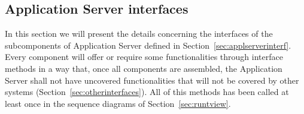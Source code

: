 \documentclass[../DD0.tex]{subfiles}
\begin{document}
  \subsection{Application Server interfaces}
  \label{sec:compinterf}

    In this section we will present the details concerning the interfaces of the subcomponents of Application Server defined in Section~\ref{sec:applserverinterf}. Every component will offer or require some functionalities through interface methods in a way that, once all components are assembled, the Application Server shall not have uncovered functionalities that will not be covered by other systems (Section~\ref{sec:otherinterfaces}). All of this methods has been called at least once in the sequence diagrams of Section~\ref{sec:runtview}.

    \subsubsection{\AccountManager}
\end{document}
